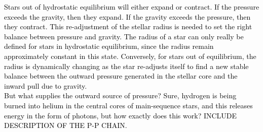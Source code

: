 \documentclass[main.tex]{subfiles}
\begin{document}
\begin{tcolorbox}[sharp corners, colback=green!30, colframe=green!80!blue, title=Box \refstepcounter{educhap1}\label{boxchap1:radius}\ref{boxchap1:radius} -- What determines the radius of a star?]
\par \textcolor{black} {Stars out of hydrostatic equilibrium will either expand or contract.  If the pressure exceeds the gravity, then they expand.  If the gravity exceeds the pressure, then they contract.  This re-adjustment of the stellar radius is needed to set the right balance between pressure and gravity.  The radius of a star can only really be defined for stars in hydrostatic equilibrium, since the radius remain approximately constant in this state.  Conversely, for stars out of equilibrium, the radius is dynamically changing as the star re-adjusts itself to find a new stable balance between the outward pressure generated in the stellar core and the inward pull due to gravity. \\
But what supplies the outward source of pressure?  Sure, hydrogen is being burned into helium in the central cores of main-sequence stars, and this releases energy in the form of photons, but how exactly does this work?  INCLUDE DESCRIPTION OF THE P-P CHAIN.}
\end{tcolorbox}



\end{document}
